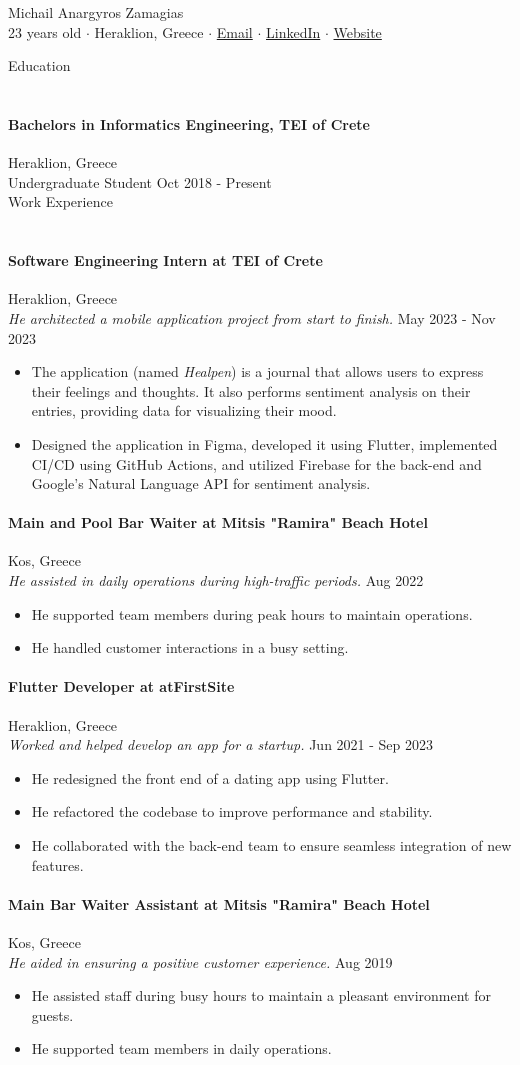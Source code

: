\documentclass[a4paper, 11pt]{article}
\newcommand{\lineunder} {
	\vspace*{-8pt} \\
	\hspace*{-18pt} \hrulefill \\
}
\newcommand{\header} [1] {
	\vspace*{6mm}
	{\hspace*{-18pt}\vspace*{6pt} #1}
	\vspace*{-6pt} \lineunder
}
\newcommand{\education}[4]{ %
	\paragraph{#1} \hfill #3 \\ %
	#2 \hfill #4 \\ %
}
\newcommand{\workexperience}[5]{ %
	\paragraph{#1} \hfill #2 \\ %
	\textit{#3} \hfill #4 \\ %
	#5 %
}
\newcommand{\socialmediabutton}[2]{%
	\href{#1}{#2}
}
\begin{document}
\vspace*{-30pt}

\begin{center}
	{\Huge {Michail Anargyros Zamagias}} \\\vspace*{2mm}
	23 years old $\cdot$
	Heraklion, Greece $\cdot$
	\socialmediabutton{mailto:contact@mikezamayias.com}{Email}$\cdot$
	\socialmediabutton{https://linkedin.com/in/mikezamayias}{LinkedIn}$\cdot$
	\socialmediabutton{https://mikezamayias.com}{Website}
\end{center}

\header{Education}
\education
{Bachelors in Informatics Engineering, TEI of Crete}
{Undergraduate Student}
{Heraklion, Greece}
{Oct 2018 - Present}

\header{Work Experience}
\workexperience
{Software Engineering Intern at TEI of Crete}
{Heraklion, Greece}
{He architected a mobile application project from start to finish.}
{May 2023 - Nov 2023}
{
	\begin{itemize} \itemsep 1pt
		\item The application (named \textit{Healpen}) is a journal that allows users to express their feelings and thoughts. It also performs sentiment analysis on their entries, providing data for visualizing their mood.
		\item Designed the application in Figma, developed it using Flutter, implemented CI/CD using GitHub Actions, and utilized Firebase for the back-end and Google's Natural Language API for sentiment analysis.
	\end{itemize}
}
\workexperience
{Main and Pool Bar Waiter at Mitsis "Ramira" Beach Hotel}
{Kos, Greece}
{He assisted in daily operations during high-traffic periods.}
{Aug 2022}
{
	\begin{itemize} \itemsep 1pt
		\item He supported team members during peak hours to maintain operations.
		\item He handled customer interactions in a busy setting.
	\end{itemize}
}
\workexperience
{Flutter Developer at atFirstSite}
{Heraklion, Greece}
{Worked and helped develop an app for a startup.}
{Jun 2021 - Sep 2023}
{
	\begin{itemize} \itemsep 1pt
		\item He redesigned the front end of a dating app using Flutter.
		\item He refactored the codebase to improve performance and stability.
		\item He collaborated with the back-end team to ensure seamless integration of new features.
	\end{itemize}
}
\workexperience
{Main Bar Waiter Assistant at Mitsis "Ramira" Beach Hotel}
{Kos, Greece}
{He aided in ensuring a positive customer experience.}
{Aug 2019}
{
	\begin{itemize} \itemsep 1pt
		\item He assisted staff during busy hours to maintain a pleasant environment for guests.
		\item He supported team members in daily operations.
	\end{itemize}
}
\end{document}
